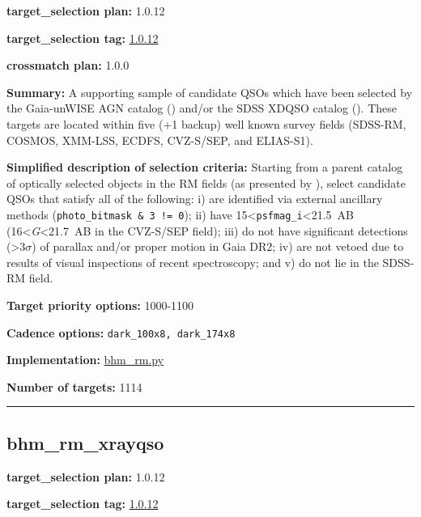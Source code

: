 \noindent\textbf{target\_selection plan:} 1.0.12

\noindent\textbf{target\_selection tag:}
\href{https://github.com/sdss/target_selection/tree/1.0.12/}{1.0.12}

\noindent\textbf{crossmatch plan:} 1.0.0

\noindent\textbf{Summary:} A supporting sample of candidate QSOs which have been
selected by the Gaia-unWISE AGN catalog
(\citealt{Shu2019}) and/or the SDSS XDQSO catalog
(\citealt{Bovy2011}). These targets are located within five (+1 backup) well
known survey fields (SDSS-RM, COSMOS, XMM-LSS, ECDFS, CVZ-S/SEP, and
ELIAS-S1).

\noindent\textbf{Simplified description of selection criteria:} Starting from a
parent catalog of optically selected objects in the RM fields (as
presented by
\citealt{Yang2022}), select candidate QSOs that satisfy all of the
following: i) are identified via external ancillary methods
(\texttt{photo\_bitmask\ \&\ 3\ !=\ 0}); ii) have
15\textless{}\texttt{psfmag\_i}\textless21.5~AB
(16\textless{}\emph{G}\textless21.7~AB in the CVZ-S/SEP field); iii) do
not have significant detections (\textgreater3$\sigma$) of parallax and/or
proper motion in Gaia DR2; iv) are not vetoed due to results of visual
inspections of recent spectroscopy; and v) do not lie in the SDSS-RM
field.


\noindent\textbf{Target priority options:} 1000-1100

\noindent\textbf{Cadence options:} \texttt{dark\_100x8,\ dark\_174x8}

\noindent\textbf{Implementation:}
\href{https://github.com/sdss/target_selection/blob/1.0.12/python/target_selection/cartons/bhm_rm.py}{bhm\_rm.py}

\noindent\textbf{Number of targets:} 1114

\begin{center}\rule{0.5\linewidth}{0.5pt}\end{center}

\hypertarget{bhm_rm_xrayqso_plan1.0.12}{%
\subsection{bhm\_rm\_xrayqso}\label{bhm_rm_xrayqso_plan1.0.12}}

\noindent\textbf{target\_selection plan:} 1.0.12

\noindent\textbf{target\_selection tag:}
\href{https://github.com/sdss/target_selection/tree/1.0.12/}{1.0.12}

